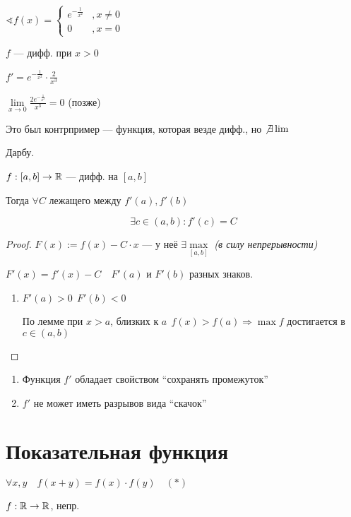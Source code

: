 $\sphericalangle f(x)=\begin{cases}
    e^{-\frac{1}{x^2}} & ,x\not=0 \\
    0 & ,x=0
\end{cases}$

$f$ --- дифф. при $x>0$

$f'=e^{-\frac{1}{x^2}}\cdot \frac{2}{x^3}$

$\lim\limits_{x\to0} \frac{2e^{-\frac{1}{x^2}}}{x^3}=0$ (позже)

Это был контрпример --- функция, которая везде дифф., но $\not\exists\lim$

\begin{theorem}
    Дарбу.

    $f:[a,b]\to\operatorname*{\mathbb{R}}$ --- дифф. на $[a,b]$

    Тогда $\forall C$ лежащего между $f'(a), f'(b)$

    $$\exists c\in(a,b) : f'(c) = C$$
\end{theorem}
\begin{proof}
    $F(x):=f(x)-C\cdot x$ --- у неё $\exists\max\limits_{[a,b]}$ \textit{(в силу непрерывности)}

    $F'(x)=f'(x)-C \quad F'(a)$ и $F'(b)$ разных знаков.

    \begin{enumerate}
        \item $F'(a)>0 \ \ F'(b) < 0$
        
        По лемме при $x>a$, близких к $a \ \ f(x) > f(a) \Rightarrow \max f$ достигается в $c\in(a,b)$
    \end{enumerate}
\end{proof}
\begin{consequence}
    \begin{enumerate}
        \item Функция $f'$ обладает свойством ``сохранять промежуток''
        \item $f'$ не может иметь разрывов вида ``скачок''
    \end{enumerate}
\end{consequence}
\section{Показательная функция}
$\forall x, y \quad f(x+y)=f(x)\cdot f(y) \quad (*)$

$f:\operatorname*{\mathbb{R}}\to\operatorname*{\mathbb{R}}$, непр.

